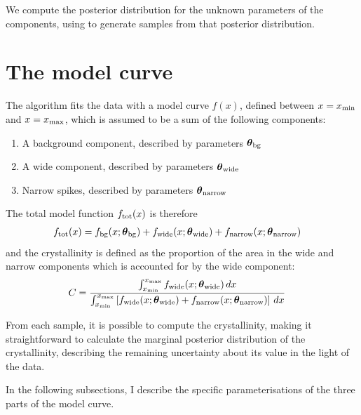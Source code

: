 \documentclass[a4paper, 12pt]{article}
\newcommand{\params}{\boldsymbol{\theta}}
\newcommand{\x}{x}
\begin{document}
We compute the posterior distribution for the unknown parameters of the
components, using \citep{dnest4} to generate samples from that posterior
distribution.

\section{The model curve}
The algorithm fits the data with a model curve
$f(\x)$, defined between $\x=\x_{\rm min}$ and $\x=\x_{\rm max}$,
which is assumed to be a sum of the following components:
\begin{enumerate}
\item A background component, described by parameters $\params_{\rm bg}$
\item A wide component, described by parameters $\params_{\rm wide}$
\item Narrow spikes, described by parameters $\params_{\rm narrow}$
\end{enumerate}

The total model function $f_{\rm tot}(x)$ is therefore
\begin{align}
f_{\rm tot}(\x) &= f_{\rm bg}(\x; \params_{\rm bg})
       + f_{\rm wide}(\x; \params_{\rm wide})
       + f_{\rm narrow}(\x; \params_{\rm narrow})
\end{align}
and the crystallinity is defined as the proportion of the area in the
wide and narrow components which is accounted for by the wide component:
\begin{align}
C &= \frac{\int_{\x_{\rm min}}^{\x_{\rm max}}
            f_{\rm wide}(\x; \params_{\rm wide}) \, d\x}
          {\int_{\x_{\rm min}}^{\x_{\rm max}}
            \left[f_{\rm wide}(\x; \params_{\rm wide})
            + f_{\rm narrow}(\x; \params_{\rm narrow}) \right] \, d\x}
\end{align}



From each sample,
it is possible to compute the crystallinity, making it straightforward to
calculate the marginal posterior distribution of the crystallinity, describing
the remaining uncertainty about its value in the light of the data.

In the following subsections, I describe the specific parameterisations of the
three parts of the model curve.
\end{document}
